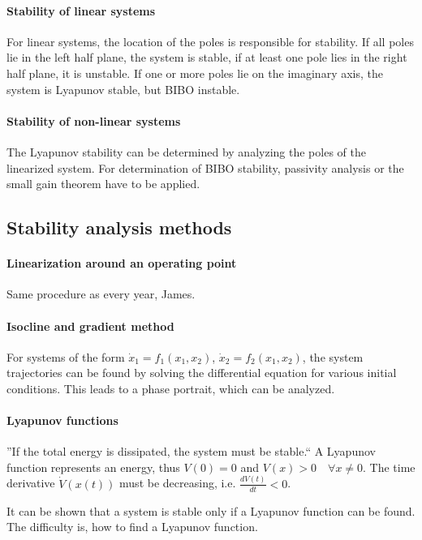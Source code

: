 \paragraph{Stability of linear systems}
For linear systems, the location of the poles is responsible for stability.
If all poles lie in the left half plane, the system is stable, if at least one
pole lies in the right half plane, it is unstable.
If one or more poles lie on the imaginary axis, the system is Lyapunov stable, but
BIBO instable.

\paragraph{Stability of non-linear systems}
The Lyapunov stability can be determined by analyzing the poles of the linearized system.
For determination of BIBO stability, passivity analysis or the small gain theorem have to be applied.

\subsection{Stability analysis methods}
\paragraph{Linearization around an operating point}
Same procedure as every year, James.

\paragraph{Isocline and gradient method}
For systems of the form $\dot{x}_1 = f_1(x_1,x_2)$, $\dot{x}_2 = f_2(x_1,x_2)$, the system trajectories
can be found by solving the differential equation for various initial conditions.
This leads to a phase portrait, which can be analyzed.

\paragraph{Lyapunov functions}
''If the total energy is dissipated, the system must be stable.``
A Lyapunov function represents an energy, thus
$V(0) = 0$ and $V(x) > 0 \quad \forall x \neq 0$.
The time derivative $\dot{V}(x(t))$ must be decreasing, i.e. $\frac{dV(t)}{dt} < 0$.

It can be shown that a system is stable only if a Lyapunov function can be found.
The difficulty is, how to find a Lyapunov function.

